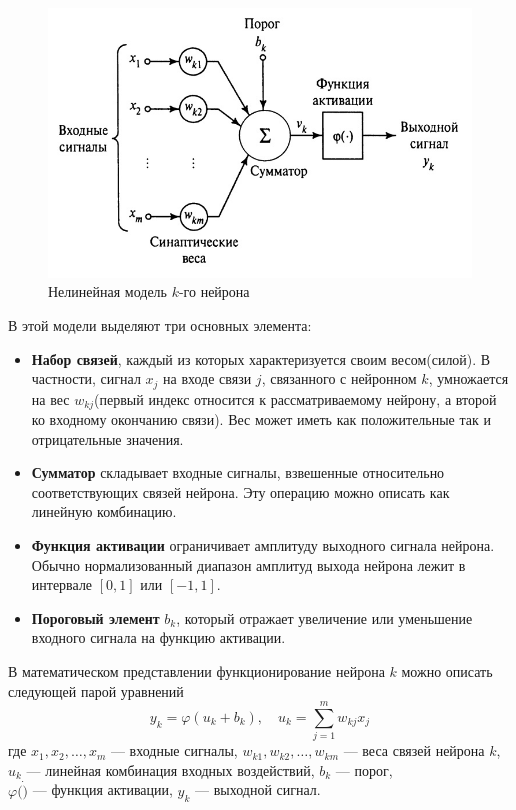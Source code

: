 \documentclass[12pt, a4paper]{article}
\renewcommand{\phi}{\varphi}
\begin{document}
\begin{figure}[!h]
	\centering
	\includegraphics[width=0.8\linewidth]{neiron}
	\caption{Нелинейная модель $k$-го нейрона}
	\label{neiron}
\end{figure}

В этой модели выделяют три основных элемента:
\begin{itemize}
	\item \textbf{Набор связей}, каждый из которых характеризуется своим весом(силой). В частности, сигнал $x_j$ на входе связи $j$, связанного с нейронном $k$, умножается на вес $w_{kj}$(первый индекс относится к рассматриваемому нейрону, а второй ко входному окончанию связи). Вес может иметь как положительные так и отрицательные значения.
	\item \textbf{Сумматор} складывает входные сигналы, взвешенные относительно соответствующих связей нейрона. Эту операцию можно описать как линейную комбинацию.
	\item \textbf{Функция активации} ограничивает амплитуду выходного сигнала нейрона. Обычно нормализованный диапазон амплитуд выхода нейрона лежит в интервале $[0, 1]$ или $[-1, 1]$.
	\item \textbf{Пороговый элемент} $b_k$, который отражает увеличение или уменьшение входного сигнала на функцию активации.
\end{itemize}

\newpage
В математическом представлении функционирование нейрона $k$ можно описать следующей парой уравнений
\begin{equation}
	y_k = \phi(u_k + b_k), \quad u_k = \sum_{j = 1}^{m} w_{kj}x_j 
	\label{1}
\end{equation}
где $x_1, x_2, \dots, x_m$ --- входные сигналы,
$w_{k1}, w_{k2}, \dots, w_{km}$ --- веса связей нейрона $k$, \\
$u_k $ --- линейная комбинация входных воздействий,
$b_k$ --- порог,\\
$ \phi(\dot) $ --- функция активации,
$ y_k $ --- выходной сигнал.
\end{document}
